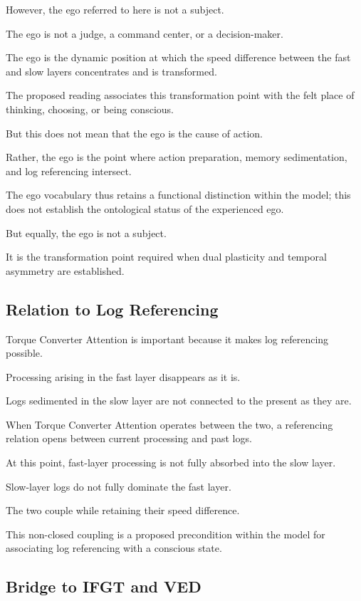 However, the ego referred to here is not a subject.

The ego is not a judge, a command center, or a decision-maker.

The ego is the dynamic position at which the speed difference between the fast and slow layers concentrates and is transformed.

The proposed reading associates this transformation point with the felt place of thinking, choosing, or being conscious.

But this does not mean that the ego is the cause of action.

Rather, the ego is the point where action preparation, memory sedimentation, and log referencing intersect.

The ego vocabulary thus retains a functional distinction within the model; this does not establish the ontological status of the experienced ego.

But equally, the ego is not a subject.

It is the transformation point required when dual plasticity and temporal asymmetry are established.

\subsection{Relation to Log Referencing}


Torque Converter Attention is important because it makes log referencing possible.

Processing arising in the fast layer disappears as it is.

Logs sedimented in the slow layer are not connected to the present as they are.

When Torque Converter Attention operates between the two, a referencing relation opens between current processing and past logs.

At this point, fast-layer processing is not fully absorbed into the slow layer.

Slow-layer logs do not fully dominate the fast layer.

The two couple while retaining their speed difference.

This non-closed coupling is a proposed precondition within the model for associating log referencing with a conscious state.

\subsection{Bridge to IFGT and VED}


